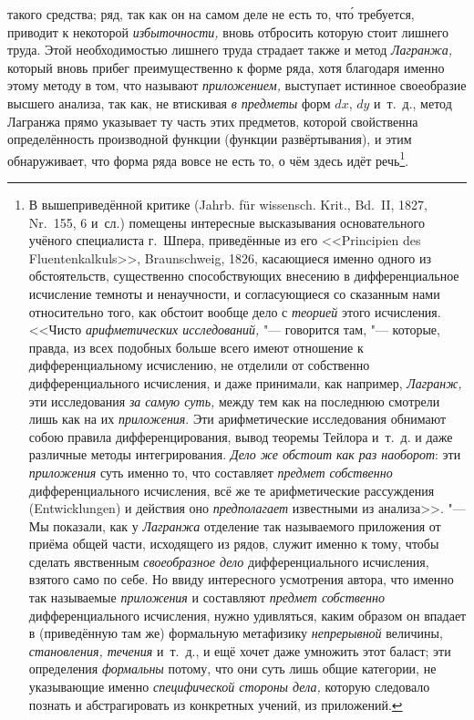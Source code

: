 такого средства; ряд, так как он на самом деле не есть то, чт\'{о} требуется,
приводит к некоторой {\em избыточности,} вновь отбросить которую стоит лишнего
труда. Этой необходимостью лишнего труда страдает также и метод {\em Лагранжа,}
который вновь прибег преимущественно к форме ряда, хотя благодаря именно этому
методу в том, что называют {\em приложением,} выступает истинное своеобразие
высшего анализа, так как, не втискивая {\em в предметы} форм $dx$, $dy$
и~т.~д., метод Лагранжа прямо указывает ту часть этих предметов, которой
свойственна определённость производной функции (функции развёртывания), и этим
обнаруживает, что форма ряда вовсе не есть то, о чём здесь идёт речь\footnote{В
вышеприведённой критике (Jahrb. für wissensch. Krit., Bd.~II, 1827, Nr.~155, 6
и~сл.) помещены интересные высказывания основательного учёного специалиста
г.~Шпера, приведённые из его <<Prin\-ci\-pien des Flu\-enten\-kal\-kuls>>,
Braun\-schweig, 1826, касающиеся именно одного из обстоятельств, существенно
способствующих внесению в дифференциальное исчисление темноты и ненаучности, и
согласующиеся со сказанным нами относительно того, как обстоит вообще дело с
{\em теорией} этого исчисления. <<Чисто {\em арифметических исследований,} "---
говорится там, "--- которые, правда, из всех подобных больше всего имеют
отношение к дифференциальному исчислению, не отделили от собственно
дифференциального исчисления, и даже принимали, как например, {\em Лагранж,}
эти исследования {\em за самую суть,} между тем как на последнюю смотрели лишь
как на их {\em приложения}. Эти арифметические исследования обнимают собою
правила дифференцирования, вывод теоремы Тейлора и~т.~д. и даже различные
методы интегрирования. {\em Дело же обстоит как раз наоборот}: эти
{\em приложения} суть именно то, что составляет {\em предмет собственно}
дифференциального исчисления, всё же те арифметические рассуждения
(Ent\-wick\-lungen) и действия оно {\em предполагает} известными из анализа>>.
"--- Мы показали, как у {\em Лагранжа} отделение так называемого приложения от
приёма общей части, исходящего из рядов, служит именно к тому, чтобы сделать
явственным {\em своеобразное дело} дифференциального исчисления, взятого само
по себе. Но ввиду интересного усмотрения автора, что именно так называемые
{\em приложения} и составляют {\em предмет собственно} дифференциального
исчисления, нужно удивляться, каким образом он впадает в (приведённую там же)
формальную метафизику {\em непрерывной} величины, {\em становления, течения}
и~т.~д., и ещё хочет даже умножить этот баласт; эти определения {\em формальны}
потому, что они суть лишь общие категории, не указывающие именно
{\em специфической стороны дела,} которую следовало познать и абстрагировать
из конкретных учений, из приложений.}.

